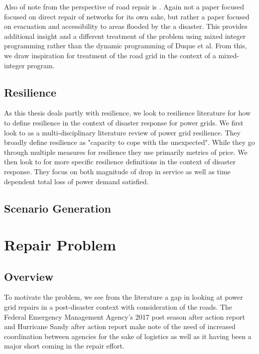 \documentclass{article}
\begin{document}
		Also of note from the perspective of road repair is \cite{AksuEA2014}. Again not a paper focused focused on direct repair of networks for its own sake, but rather a paper focused on evacuation and accessibility to areas flooded by the a disaster. This provides additional insight and a different treatment of the problem using mixed integer programming rather than the dynamic programming of Duque et al. From this, we draw inspiration for treatment of the road grid in the context of a mixed-integer program.
	
	\subsection{Resilience}
		As this thesis deals partly with resilience, we look to resilience literature for how to define resilience in the context of disaster response for power grids. We first look to \cite{MolyneauxEA2016} as a multi-disciplinary literature review of power grid resilience. They broadly define resilience as "capacity to cope with the unexpected". While they go through multiple measures for resilience they use primarily metrics of price. We then look to \cite{Panteli2017} for more specific resilience definitions in the context of disaster response. They focus on both magnitude of drop in service as well as time dependent total loss of power demand satisfied.

	\subsection{Scenario Generation}
	
	
	\section{Repair Problem}
	
	\subsection{Overview}
	To motivate the problem, we see from the literature a gap in looking at power grid repairs in a post-disaster context with consideration of the roads. The Federal Emergency Management Agency's 2017 post season after action report\cite{FEMA2017AAR}  and Hurricane Sandy after action report \cite{FEMASandyAAR} make note of the need of increased coordination between agencies for the sake of logistics as well as it having been a major short coming in the repair effort.
	
\end{document}
